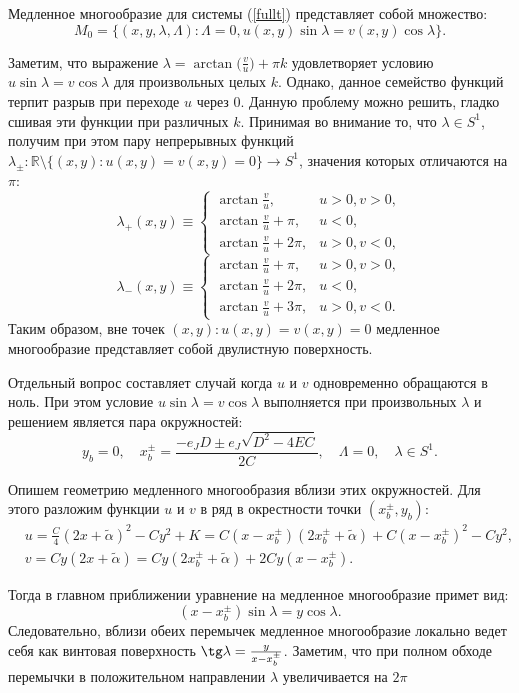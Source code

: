 Медленное многообразие для системы (\ref{fullt}) представляет собой множество:
$$M_0 = \{(x, y, \lambda, \Lambda): \Lambda = 0, u(x,y) \sin \lambda = v(x,y) \cos \lambda \}.$$

Заметим, что выражение $\lambda = \arctan \big( \frac{v}{u} \big) + \pi k$ удовлетворяет условию $u \sin \lambda = v \cos \lambda$ для произвольных целых $k$. Однако, данное семейство функций терпит разрыв при переходе $u$ через 0. Данную проблему можно решить, гладко сшивая эти функции при различных $k$. Принимая во внимание то, что $\lambda\in S^{1}$, получим при этом пару непрерывных функций 
\newline $\lambda_{\pm}:\mathbb{R} \setminus \{ (x,y): u(x,y) = v(x,y) = 0 \}\to S^{1}$, значения которых отличаются на $\pi$:
$$\lambda_{+}(x,y) \equiv \begin{cases} 
        \arctan \frac{v}{u},        &  u>0, v > 0, \\
        \arctan \frac{v}{u} + \pi,  &  u<0, \\
        \arctan \frac{v}{u} + 2\pi, &  u>0, v<0,
       \end{cases}
$$
$$\lambda_{-}(x,y) \equiv \begin{cases} 
        \arctan \frac{v}{u} + \pi,  &  u>0, v > 0, \\
        \arctan \frac{v}{u} + 2\pi, &  u<0, \\
        \arctan \frac{v}{u} + 3\pi, &  u>0, v<0.
       \end{cases}
$$
Таким образом, вне точек $(x,y): u(x,y) = v(x,y) = 0$ медленное многообразие представляет собой двулистную поверхность.

Отдельный вопрос составляет случай когда $u$ и $v$ одновременно обращаются в ноль. При этом условие $u \sin \lambda = v \cos \lambda$ выполняется при произвольных 
$\lambda$ и решением является пара окружностей:
$$y_b=0,\quad x_b^{\pm}=\frac{-e_JD \pm e_J \sqrt{D^2-4EC}}{2C},\quad \Lambda = 0,\quad \lambda\in S^{1}.$$

Опишем геометрию медленного многообразия вблизи этих окружностей. Для этого разложим функции $u$ и $v$ в ряд в окрестности точки $(x_{b}^{\pm}, y_{b})$:
\begin{align*}
&u = \frac{C}{4}(2x+\tilde \alpha)^2-Cy^2+K = C(x-x_b^\pm)(2x_b^\pm + \tilde \alpha) + C(x-x_b^\pm)^2 - Cy^2,\\
&v = Cy(2x+ \tilde \alpha) = Cy(2x_b^\pm + \tilde \alpha) + 2Cy(x-x_b^\pm).
\end{align*}

Тогда в главном приближении уравнение на медленное многообразие примет вид:
$$(x-x_b^\pm)\sin \lambda = y \cos \lambda.$$
Следовательно, вблизи обеих перемычек медленное многообразие локально ведет себя как винтовая поверхность $\tg\lambda = \frac{y}{x-x_{b}^{\pm}}$.
Заметим, что при полном обходе перемычки в положительном направлении $\lambda$ увеличивается на $2\pi$

